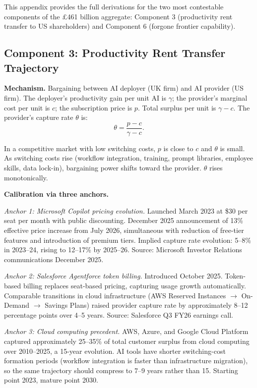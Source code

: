 \documentclass[11pt,letterpaper]{article}
\theoremstyle{remark}
\begin{document}
This appendix provides the full derivations for the two most contestable components of the £461 billion aggregate: Component 3 (productivity rent transfer to US shareholders) and Component 6 (forgone frontier capability).

\subsection{Component 3: Productivity Rent Transfer Trajectory}

\textbf{Mechanism.} Bargaining between AI deployer (UK firm) and AI provider (US firm). The deployer's productivity gain per unit AI is $\gamma$; the provider's marginal cost per unit is $c$; the subscription price is $p$. Total surplus per unit is $\gamma - c$. The provider's capture rate $\theta$ is:
\[
\theta = \frac{p - c}{\gamma - c}.
\]

In a competitive market with low switching costs, $p$ is close to $c$ and $\theta$ is small. As switching costs rise (workflow integration, training, prompt libraries, employee skills, data lock-in), bargaining power shifts toward the provider. $\theta$ rises monotonically.

\textbf{Calibration via three anchors.}

\textit{Anchor 1: Microsoft Copilot pricing evolution.} Launched March 2023 at \$30 per seat per month with public discounting. December 2025 announcement of 13\% effective price increase from July 2026, simultaneous with reduction of free-tier features and introduction of premium tiers. Implied capture rate evolution: 5--8\% in 2023--24, rising to 12--17\% by 2025--26. Source: Microsoft Investor Relations communications December 2025.

\textit{Anchor 2: Salesforce Agentforce token billing.} Introduced October 2025. Token-based billing replaces seat-based pricing, capturing usage growth automatically. Comparable transitions in cloud infrastructure (AWS Reserved Instances $\rightarrow$ On-Demand $\rightarrow$ Savings Plans) raised provider capture rate by approximately 8--12 percentage points over 4--5 years. Source: Salesforce Q3 FY26 earnings call.

\textit{Anchor 3: Cloud computing precedent.} AWS, Azure, and Google Cloud Platform captured approximately 25--35\% of total customer surplus from cloud computing over 2010--2025, a 15-year evolution. AI tools have shorter switching-cost formation periods (workflow integration is faster than infrastructure migration), so the same trajectory should compress to 7--9 years rather than 15. Starting point 2023, mature point 2030.
\end{document}
